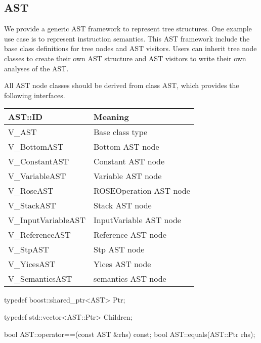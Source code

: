 \subsection{AST}
\label{sec:ast}

We provide a generic AST framework to represent tree structures. One example use
case is to represent instruction semantics. This AST framework include the base
class definitions for tree nodes and AST visitors. Users can inherit tree node
classes to create their own AST structure and AST visitors to write their own
analyses of the AST. 

All AST node classes should be derived from class AST, which provides the
following interfaces.

\begin{center}
\begin{tabular}{ll}
\toprule
AST::ID  & Meaning \\
\midrule 
    V\_AST & Base class type \\
    V\_BottomAST & Bottom AST node \\
    V\_ConstantAST & Constant AST node \\
    V\_VariableAST & Variable AST node \\
    V\_RoseAST & ROSEOperation AST node \\
    V\_StackAST & Stack AST node \\
    V\_InputVariableAST & InputVariable AST node \\
    V\_ReferenceAST & Reference AST node \\
    V\_StpAST & Stp AST node\\
    V\_YicesAST & Yices AST node \\
    V\_SemanticsAST & semantics AST node \\

\bottomrule
\end{tabular}
\end{center}

\begin{apient}
typedef boost::shared_ptr<AST> Ptr;
\end{apient}

\begin{apient}
typedef std::vector<AST::Ptr> Children;      
\end{apient}

\begin{apient}
bool AST::operator==(const AST &rhs) const; 
bool AST::equals(AST::Ptr rhs);
\end{apient}

